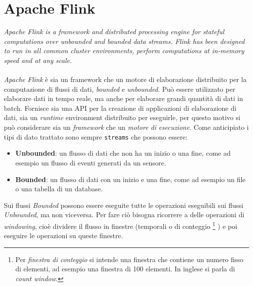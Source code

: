 \newpage
\section{Apache Flink}
\label{sec:flink_overview}
\textit{Apache Flink is a framework and distributed processing engine for stateful computations over unbounded and bounded data streams. Flink has been designed to run in all common cluster environments, perform computations at in-memory speed and at any scale.}\cite*{flinkwebsite}\\\\
\textit{Apache Flink} è sia un framework che un motore di elaborazione distribuito per la computazione di flussi di dati, \textit{bounded} e \textit{unbounded}.
Può essere utilizzato per elaborare dati in tempo reale, ma anche per elaborare grandi quantità di dati in batch.
Fornisce sia una API per la creazione di applicazioni di elaborazione di dati, sia un \textit{runtime} environment distribuito per eseguirle,
per questo motivo si può considerare sia un \textit{framework} che un \textit{motore di esecuzione}.
Come anticipiato i tipi di dato trattato sono sempre \texttt{streams} che possono essere:
\begin{itemize}
    \item \textbf{Unbounded}: un flusso di dati che non ha un inizio o una fine, come ad esempio un flusso di eventi generati da un sensore.
    \item \textbf{Bounded}: un flusso di dati con un inizio e una fine, come ad esempio un file o una tabella di un database.
\end{itemize}
Sui flussi \textit{Bounded} possono essere eseguite tutte le operazioni eseguibili sui flussi \textit{Unbounded}, ma non viceversa.
Per fare ciò bisogna ricorrere a delle operazioni di \textit{windowing}, cioè dividere il flusso in finestre (temporali o di conteggio 
\footnote{Per \textit{finestra di conteggio} si intende una finestra che contiene un numero fisso di elementi, ad esempio una finestra di 100 elementi.
In inglese si parla di \textit{count window}.}
) e poi eseguire le operazioni su queste finestre.


